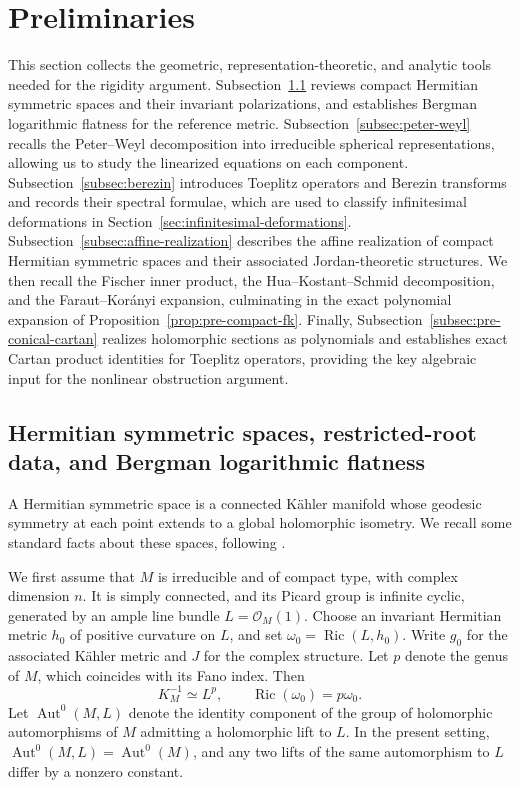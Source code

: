 \documentclass[11pt,reqno]{amsart}
\theoremstyle{corollary}
\theoremstyle{conjecture}
\theoremstyle{assumption}
\theoremstyle{proposition}
\theoremstyle{remark}
\numberwithin{equation}{section}
\DeclareMathOperator{\Ric}{Ric}
\begin{document}
\section{Preliminaries}\label{sec:pre}
This section collects the geometric, representation-theoretic, and analytic tools needed for the rigidity argument. Subsection~\ref{subsec:hermitian-symmetric-spaces} reviews compact Hermitian symmetric spaces and their invariant polarizations, and establishes Bergman logarithmic flatness for the reference metric. Subsection~\ref{subsec:peter-weyl} recalls the Peter--Weyl decomposition into irreducible spherical representations, allowing us to study the linearized equations on each component. Subsection~\ref{subsec:berezin} introduces Toeplitz operators and Berezin transforms and records their spectral formulae, which are used to classify infinitesimal deformations in Section~\ref{sec:infinitesimal-deformations}. Subsection~\ref{subsec:affine-realization} describes the affine realization of compact Hermitian symmetric spaces and their associated Jordan-theoretic structures. We then recall the Fischer inner product, the Hua--Kostant--Schmid decomposition, and the Faraut--Kor\'anyi expansion, culminating in the exact polynomial expansion of Proposition~\ref{prop:pre-compact-fk}. Finally, Subsection~\ref{subsec:pre-conical-cartan} realizes holomorphic sections as polynomials and establishes exact Cartan product identities for Toeplitz operators, providing the key algebraic input for the nonlinear obstruction argument.

\subsection{Hermitian symmetric spaces, restricted-root data, and Bergman logarithmic flatness}\label{subsec:hermitian-symmetric-spaces}

A Hermitian symmetric space is a connected K\"ahler manifold whose geodesic symmetry at each point extends to a global holomorphic isometry. We recall some standard facts about these spaces, following \cite{Helgason1978,Knapp2002}.

We first assume that $M$ is irreducible and of compact type, with complex dimension $n$. It is simply connected, and its Picard group is infinite cyclic, generated by an ample line bundle $L=\mathcal O_M(1)$. Choose an invariant Hermitian metric $h_0$ of positive curvature on $L$, and set $\omega_0=\Ric(L,h_0)$. Write $g_0$ for the associated K\"ahler metric and $J$ for the complex structure. Let $p$ denote the genus of $M$, which coincides with its Fano index. Then
\[
K_M^{-1}\simeq L^p,\qquad \Ric(\omega_0)=p\omega_0.
\]
Let $\operatorname{Aut}^0(M,L)$ denote the identity component of the group of holomorphic automorphisms of $M$ admitting a holomorphic lift to $L$. In the present setting, $\operatorname{Aut}^0(M,L)=\operatorname{Aut}^0(M)$, and any two lifts of the same automorphism to $L$ differ by a nonzero constant.
\end{document}
